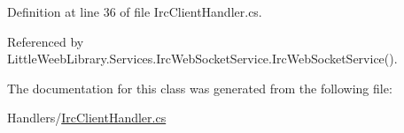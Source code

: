 Definition at line 36 of file Irc\+Client\+Handler.\+cs.



Referenced by Little\+Weeb\+Library.\+Services.\+Irc\+Web\+Socket\+Service.\+Irc\+Web\+Socket\+Service().



The documentation for this class was generated from the following file\+:\begin{DoxyCompactItemize}
\item 
Handlers/\mbox{\hyperlink{_irc_client_handler_8cs}{Irc\+Client\+Handler.\+cs}}\end{DoxyCompactItemize}
